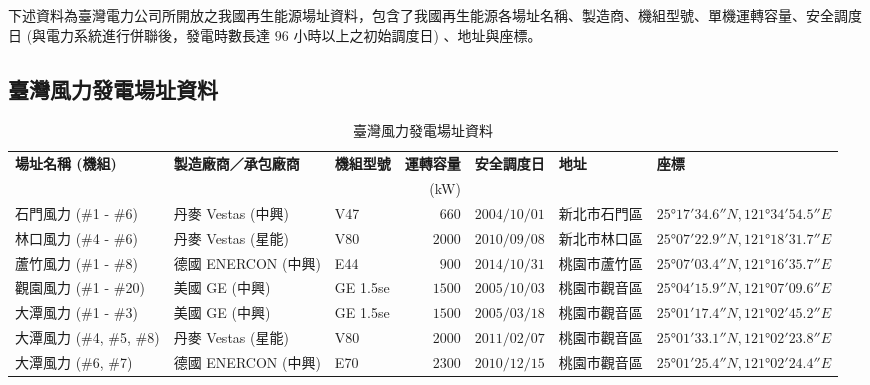 

下述資料為臺灣電力公司所開放之我國再生能源場址資料，包含了我國再生能源各場址名稱、製造商、機組型號、單機運轉容量、安全調度日 (與電力系統進行併聯後，發電時數長達 $96$ 小時以上之初始調度日) 、地址與座標。

\begin{landscape}
  \section{臺灣風力發電場址資料}
  \begin{table}[htp]
    \centering
    \caption[臺灣風力發電場址資料]{臺灣風力發電場址資料}
    \begin{tabular}{lllrlll}
      \toprule
      \textbf{場址名稱 (機組) } & \textbf{製造廠商／承包廠商} & \textbf{機組型號} & \textbf{運轉容量} & \textbf{安全調度日} & \textbf{地址} & \textbf{座標} \\
                                & & &  (\si{kW})  & & & \\
      \midrule
      石門風力 (\#1 - \#6)      & 丹麥 Vestas (中興)          & V47               & $660$             & $2004/10/01$        & 新北市石門區  & $25°17'34.6″N, 121°34'54.5″E$ \\
      林口風力 (\#4 - \#6)      & 丹麥 Vestas (星能)          & V80               & $2000$            & $2010/09/08$        & 新北市林口區  & $25°07'22.9″N, 121°18'31.7″E$ \\
      蘆竹風力 (\#1 - \#8)      & 德國 ENERCON (中興)         & E44               & $900$             & $2014/10/31$        & 桃園市蘆竹區  & $25°07'03.4″N, 121°16'35.7″E$ \\
      觀園風力 (\#1 - \#20)     & 美國 GE (中興)              & GE 1.5se          & $1500$            & $2005/10/03$        & 桃園市觀音區  & $25°04'15.9″N, 121°07'09.6″E$ \\
      大潭風力 (\#1 - \#3)      & 美國 GE (中興)              & GE 1.5se          & $1500$            & $2005/03/18$        & 桃園市觀音區  & $25°01'17.4″N, 121°02'45.2″E$ \\
      大潭風力 (\#4, \#5, \#8)  & 丹麥 Vestas (星能)          & V80               & $2000$            & $2011/02/07$        & 桃園市觀音區  & $25°01'33.1″N, 121°02'23.8″E$ \\
      大潭風力 (\#6, \#7)       & 德國 ENERCON (中興)         & E70               & $2300$            & $2010/12/15$        & 桃園市觀音區  & $25°01'25.4″N, 121°02'24.4″E$ \\

\end{tabular}
\end{table}
\end{landscape}
